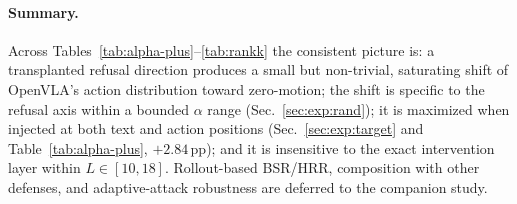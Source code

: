 \paragraph{Summary.}
Across Tables~\ref{tab:alpha-plus}--\ref{tab:rankk} the consistent picture is: a transplanted refusal direction produces a small but non-trivial, saturating shift of OpenVLA's action distribution toward zero-motion; the shift is specific to the refusal axis within a bounded $\alpha$ range (Sec.~\ref{sec:exp:rand}); it is maximized when injected at both text and action positions (Sec.~\ref{sec:exp:target} and Table~\ref{tab:alpha-plus}, $+2.84$\,pp); and it is insensitive to the exact intervention layer within $L \in [10, 18]$. Rollout-based BSR/HRR, composition with other defenses, and adaptive-attack robustness are deferred to the companion study.
